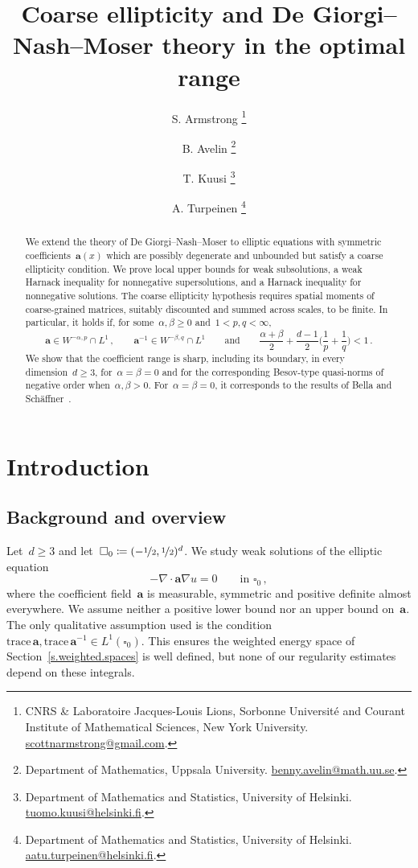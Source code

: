 \documentclass[11pt,letterpaper]{article}
\title{Coarse ellipticity and De Giorgi--Nash--Moser theory in the optimal range}
\author{S. Armstrong
\thanks{CNRS \& Laboratoire Jacques-Louis Lions, Sorbonne Universit\'e and Courant Institute of Mathematical Sciences, New York University. {\footnotesize\href{mailto:scottnarmstrong@gmail.com}{scottnarmstrong@gmail.com}.}}
\and
B. Avelin
\thanks{Department of Mathematics, Uppsala University. {\footnotesize\href{mailto:benny.avelin@math.uu.se}{benny.avelin@math.uu.se}.}}
\and
T. Kuusi
\thanks{Department of Mathematics and Statistics, University of Helsinki. {\footnotesize\href{mailto:tuomo.kuusi@helsinki.fi}{tuomo.kuusi@helsinki.fi}.}}
\and
A. Turpeinen
\thanks{Department of Mathematics and Statistics, University of Helsinki. {\footnotesize\href{mailto:aatu.turpeinen@helsinki.fi}{aatu.turpeinen@helsinki.fi}.}}
}
\date{}
\numberwithin{equation}{section}
\theoremstyle{definition}
\renewcommand{\a}{\mathbf{a}}
\newcommand{\nf}{\nicefrac}
\newcommand{\cu}{\square}
\newcommand*{\tr}{\mathrm{trace\,}}
\begin{document}
\maketitle

\begin{abstract}
We extend the theory of De Giorgi--Nash--Moser to elliptic equations with symmetric coefficients~$\mathbf{a}(x)$ which are possibly degenerate and unbounded but satisfy a coarse ellipticity condition. 
We prove local upper bounds for weak subsolutions, a weak Harnack inequality for nonnegative supersolutions, and a Harnack inequality for nonnegative solutions. 
The coarse ellipticity hypothesis requires spatial moments of coarse-grained matrices, suitably discounted and summed across scales, to be finite. In particular, it holds if, for some~$\alpha,\beta\geq0$ and~$1<p,q<\infty$,
\begin{equation*}
	\mathbf{a}\in W^{-\alpha,p}\cap L^1\,,\qquad\mathbf{a}^{-1}\in W^{-\beta,q}\cap L^1\qquad\mbox{and}\qquad \frac{\alpha+\beta}{2}+\frac{d-1}{2}\biggl(\frac1p+\frac1q\biggr)< 1\,.
\end{equation*}
We show that the coefficient range is sharp, including its boundary, in every dimension~$d\geq3$, for~$\alpha=\beta=0$ and for the corresponding Besov-type quasi-norms of negative order when~$\alpha,\beta>0$. For~$\alpha=\beta=0$, it corresponds to the results of Bella and Sch\"affner~\cite{Bella.Schaffner.regularity}. 
\end{abstract}

\tableofcontents

\section{Introduction}
\label{s.introduction}

\subsection{Background and overview}

Let~$d\geq3$ and let~$\cu_0\coloneqq(-\nf12,\nf12)^d$. We study weak solutions of the elliptic equation
\begin{equation}
	-\nabla\cdot\a\nabla u=0\qquad\mbox{in }\cu_0\,,
	\label{e.subsolution.equation}
\end{equation}
where the coefficient field~$\a$ is measurable, symmetric and positive definite almost everywhere. We assume neither a positive lower bound nor an upper bound on~$\a$. The only qualitative assumption used is the condition~$\tr\a,\tr\a^{-1}\in L^1(\cu_0)$. This ensures the weighted energy space of Section~\ref{s.weighted.spaces} is well defined, but none of our regularity estimates depend on these integrals.
\end{document}
